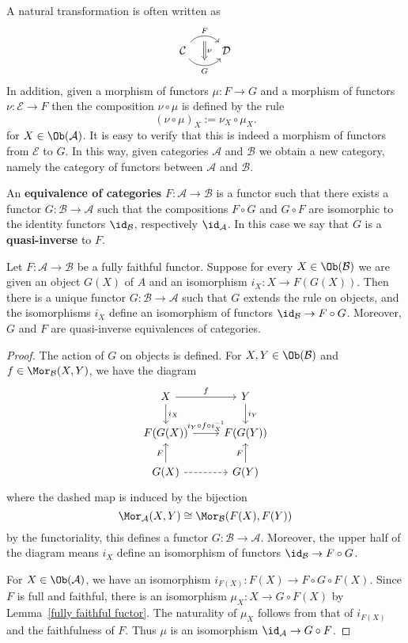 A natural transformation is often written as
\[\begin{tikzcd}
\mathcal{C}\ar[r,bend left=50,"F",""'{name=F,below}]\ar[r,bend right=50,swap,"G",""'{name=G,above}]&\mathcal{D}
\arrow[Rightarrow,from=F,to=G,"\nu"]
\end{tikzcd}\]
In addition, given a morphism of functors $\mu:F\to G$ and a morphism of functors $\nu:\mathscr{E}\to F$ then the composition $\nu\circ\mu$ is defined by the rule
\[(\nu\circ\mu)_X:=\nu_X\circ\mu_X.\]
for $X\in\Ob(\mathcal{A})$. It is easy to verify that this is indeed a morphism of functors from $\mathscr{E}$ to $G$. In this way, given categories $\mathcal{A}$ and $\mathcal{B}$ we obtain a new category, namely
the category of functors between $\mathcal{A}$ and $\mathcal{B}$.
\begin{definition}
An \textbf{equivalence of categories} $F:\mathcal{A}\to\mathcal{B}$ is a functor such that there exists a functor $G:\mathcal{B}\to\mathcal{A}$ such that the compositions $F\circ G$ and $G\circ F$ are isomorphic to the identity functors $\id_{\mathcal{B}}$, respectively $\id_{\mathcal{A}}$. In this case we say that $G$ is a \textbf{quasi-inverse} to $F$.
\end{definition}
\begin{proposition}\label{equiv category iff}
Let $F:\mathcal{A}\to\mathcal{B}$ be a fully faithful functor. Suppose for every $X\in\Ob(\mathcal{B})$ we are given an object $G(X)$ of $A$ and an isomorphism $i_X:X\to F(G(X))$. Then there is a unique functor $G:\mathcal{B}\to\mathcal{A}$ such that $G$ extends the rule on objects, and the isomorphisms $i_X$ define an isomorphism of functors $\id_{\mathcal{B}}\to F\circ G$. Moreover, $G$ and $F$ are quasi-inverse equivalences of categories.
\end{proposition}
\begin{proof}
The action of $G$ on objects is defined. For $X,Y\in\Ob(\mathcal{B})$ and $f\in\Mor_{\mathcal{B}}(X,Y)$, we have the diagram
\[\begin{tikzcd}
X\ar[r,"f"]\ar[d,"i_X"]&Y\ar[d,"i_Y"]\\
F(G(X))\ar[r,"i_Y\circ f\circ i_X^{-1}"]&F(G(Y))\\
G(X)\ar[r,dashed]\ar[u,"F"]&G(Y)\ar[u,"F"]
\end{tikzcd}\]
where the dashed map is induced by the bijection
\[\Mor_{\mathcal{A}}(X,Y)\cong\Mor_{\mathcal{B}}(F(X),F(Y))\]
by the functoriality, this defines a functor $G:\mathcal{B}\to\mathcal{A}$. Moreover, the upper half of the diagram means $i_X$ define an isomorphism of functors $\id_{\mathcal{B}}\to F\circ G$.\par
For $X\in\Ob(\mathcal{A})$, we have an isomorphism $i_{F(X)}:F(X)\to F\circ G\circ F(X)$. Since $F$ is full and faithful, there is an isomorphism $\mu_{X}:X\to G\circ F(X)$ by Lemma~\ref{fully faithful fuctor}. The naturality of $\mu_X$ follows from that of $i_{F(X)}$ and the faithfulness of $F$. Thus $\mu$ is an isomorphism $\id_{\mathcal{A}}\to G\circ F$.
\end{proof}
